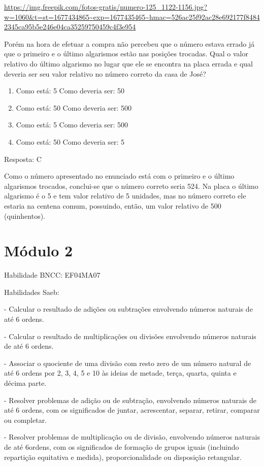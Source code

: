 \url{https://img.freepik.com/fotos-gratis/numero-125_1122-1156.jpg?w=1060\&t=st=1677434865~exp=1677435465~hmac=526ac25f92ac28e692177f84842345ca95b5e246e04ca35259750459c4f3e954}

Porém na hora de efetuar a compra não percebeu que o número estava
errado já que o primeiro e o último algarismos estão nas posições
trocadas. Qual o valor relativo do último algarismo no lugar que ele se
encontra na placa errada e qual deveria ser seu valor relativo no número
correto da casa de José?

\begin{enumerate}
\def\labelenumi{\alph{enumi})}
\item
  Como está: 5 Como deveria ser: 50
\item
  Como está: 50 Como deveria ser: 500
\item
  Como está: 5 Como deveria ser: 500
\item
  Como está: 50 Como deveria ser: 5
\end{enumerate}

Resposta: C

Como o número apresentado no enunciado está com o primeiro e o último
algarismos trocados, conclui-se que o número correto seria 524. Na placa
o último algarismo é o 5 e tem valor relativo de 5 unidades, mas no
número correto ele estaria na centena comum, possuindo, então, um valor
relativo de 500 (quinhentos).

\section{Módulo 2}\label{muxf3dulo-2}

Habilidade BNCC: EF04MA07

Habilidades Saeb:

- Calcular o resultado de adições ou subtrações envolvendo números
naturais de até 6 ordens.

- Calcular o resultado de multiplicações ou divisões envolvendo números
naturais de até 6 ordens.

- Associar o quociente de uma divisão com resto zero de um número
natural de até 6 ordens por 2, 3, 4, 5 e 10 às ideias de metade, terça,
quarta, quinta e décima parte.

- Resolver problemas de adição ou de subtração, envolvendo números
naturais de até 6 ordens, com os significados de juntar, acrescentar,
separar, retirar, comparar ou completar.

- Resolver problemas de multiplicação ou de divisão, envolvendo números
naturais de até 6ordens, com os significados de formação de grupos
iguais (incluindo repartição equitativa e medida), proporcionalidade ou
disposição retangular.

